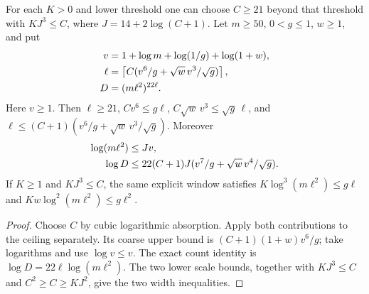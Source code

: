 \begin{lemma}
    \label{lem:interleaved_filter_scale_count}
    \leanok
    For each $K>0$ and lower threshold one can choose $C\ge21$ beyond
    that threshold with $KJ^3\le C$, where $J=14+2\log(C+1)$.
    Let $m\ge50$, $0<g\le1$, $w\ge1$, and put
    \begin{align}
        v    & =1+\log m+\log(1/g)+\log(1+w),\notag                          \\
        \ell & =\left\lceil C(v^6/g+\sqrt w\,v^3/\sqrt g)\right\rceil,\notag \\
        D    & =(m\ell^2)^{22\ell}.\notag
    \end{align}
    Here $v\ge1$. Then $\ell\ge21$, $Cv^6\le g\ell$,
    $C\sqrt w\,v^3\le\sqrt g\,\ell$, and
    $\ell\le(C+1)(v^6/g+\sqrt w\,v^3/\sqrt g)$. Moreover
    \begin{align}
        \log(m\ell^2) & \le Jv,\notag                                  \\
        \log D        & \le22(C+1)J(v^7/g+\sqrt w\,v^4/\sqrt g).\notag
    \end{align}
    If $K\ge1$ and $KJ^3\le C$, the same explicit window satisfies
    $K\log^3(m\ell^2)\le g\ell$ and
    $Kw\log^2(m\ell^2)\le g\ell^2$.
\end{lemma}
\begin{proof}\leanok
    Choose $C$ by cubic logarithmic absorption. Apply both contributions
    to the ceiling separately. Its coarse upper bound is
    $(C+1)(1+w)v^6/g$; take logarithms and use $\log v\le v$.
    The exact count identity is $\log D=22\ell\log(m\ell^2)$.
    The two lower scale bounds, together with $KJ^3\le C$ and
    $C^2\ge C\ge KJ^2$, give the two width inequalities.
\end{proof}




